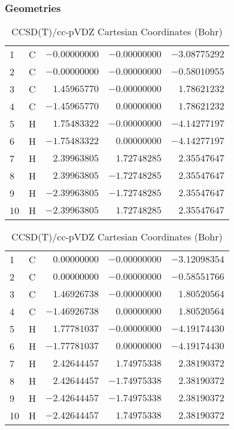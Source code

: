 \documentclass[10pt,oneside]{article}
\begin{document}
\begin{table}[h!]
\subsubsection*{Geometries}
\begin{multicols}{2}
\centering
\caption{CCSD(T)/cc-pVTZ Cartesian Coordinates (Bohr)}
\begin{tabular}{llrrr}
\toprule
1  & C  & $-0.00000000$ & $-0.00000000$ & $-3.08775292$ \\
2  & C  & $-0.00000000$ & $-0.00000000$ & $-0.58010955$ \\
3  & C  & $ 1.45965770$ & $-0.00000000$ & $ 1.78621232$ \\
4  & C  & $-1.45965770$ & $ 0.00000000$ & $ 1.78621232$ \\
5  & H  & $ 1.75483322$ & $-0.00000000$ & $-4.14277197$ \\
6  & H  & $-1.75483322$ & $ 0.00000000$ & $-4.14277197$ \\
7  & H  & $ 2.39963805$ & $ 1.72748285$ & $ 2.35547647$ \\
8  & H  & $ 2.39963805$ & $-1.72748285$ & $ 2.35547647$ \\
9  & H  & $-2.39963805$ & $-1.72748285$ & $ 2.35547647$ \\
10 & H  & $-2.39963805$ & $ 1.72748285$ & $ 2.35547647$ \\
\bottomrule
\end{tabular}
\caption{CCSD(T)/cc-pVDZ Cartesian Coordinates (Bohr)}
\begin{tabular}{llrrr}
\toprule
1  & C  & $ 0.00000000$ & $-0.00000000$ & $-3.12098354$ \\
2  & C  & $ 0.00000000$ & $-0.00000000$ & $-0.58551766$ \\
3  & C  & $ 1.46926738$ & $-0.00000000$ & $ 1.80520564$ \\
4  & C  & $-1.46926738$ & $ 0.00000000$ & $ 1.80520564$ \\
5  & H  & $ 1.77781037$ & $-0.00000000$ & $-4.19174430$ \\
6  & H  & $-1.77781037$ & $ 0.00000000$ & $-4.19174430$ \\
7  & H  & $ 2.42644457$ & $ 1.74975338$ & $ 2.38190372$ \\
8  & H  & $ 2.42644457$ & $-1.74975338$ & $ 2.38190372$ \\
9  & H  & $-2.42644457$ & $-1.74975338$ & $ 2.38190372$ \\
10 & H  & $-2.42644457$ & $ 1.74975338$ & $ 2.38190372$ \\
\bottomrule
\end{tabular}
\end{multicols}
\end{table}
\end{document}
